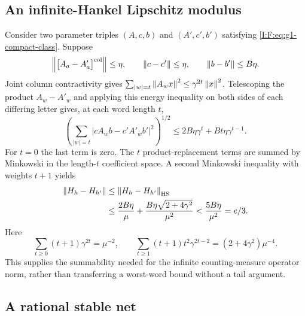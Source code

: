 \subsection{An infinite-Hankel Lipschitz modulus}

Consider two parameter triples $(A,c,b)$ and $(A',c',b')$ satisfying
\eqref{I:F:eq:g1-compact-class}. Suppose
\[
 \left\lVert\begin{bmatrix}A_a-A'_a\end{bmatrix}^{\rm col}\right\rVert\le\eta,
 \qquad\left\lVert c-c'\right\rVert\le\eta,
 \qquad\left\lVert b-b'\right\rVert\le B\eta.
\]
Joint column contractivity gives
$\sum_{|w|=t}\left\lVert A_wx\right\rVert^2\le\gamma^{2t}\left\lVert x\right\rVert^2$.
Telescoping the product $A_w-A'_w$ and applying this energy inequality on
both sides of each differing letter gives, at each word length $t$,
\[
 \left(\sum_{|w|=t}|cA_wb-c'A'_wb'|^2\right)^{1/2}
 \le2B\eta\gamma^t+Bt\eta\gamma^{t-1}.
\]
For $t=0$ the last term is zero. The $t$ product-replacement terms are
summed by Minkowski in the length-$t$ coefficient space. A second
Minkowski inequality with weights $t+1$ yields
\begin{align}
 \left\lVert H_h-H_{h'}\right\rVert
 &\le\left\lVert H_h-H_{h'}\right\rVert_{\rm HS}\nonumber\\
 &\le\frac{2B\eta}{\mu}
       +\frac{B\eta\sqrt{2+4\gamma^2}}{\mu^2}
 <\frac{5B\eta}{\mu^2}=e/3.
 \label{I:F:eq:g1-Lipschitz}
\end{align}
Here
\[
 \sum_{t\ge0}(t+1)\gamma^{2t}=\mu^{-2},\qquad
 \sum_{t\ge1}(t+1)t^2\gamma^{2t-2}
 =(2+4\gamma^2)\mu^{-4}.
\]
This supplies the summability needed for the infinite counting-measure
operator norm, rather than transferring a worst-word bound without a tail
argument.

\subsection{A rational stable net}

